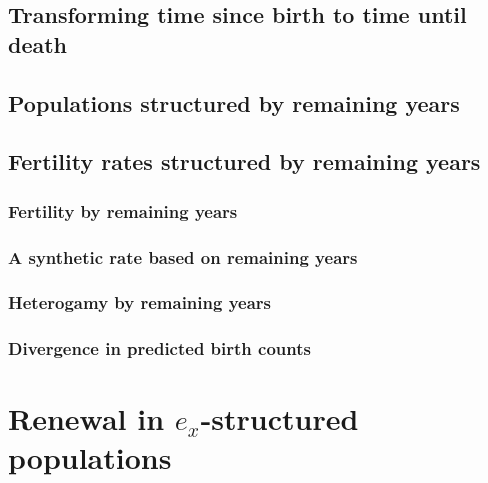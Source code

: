   \section{Transforming time since birth to time until death}
    
    
  \section{Populations structured by remaining years}
    
  
  \section{Fertility rates structured by remaining years}
    
    
    \subsection{Fertility by remaining years}
      
      
    \subsection{A synthetic rate based on remaining years}
      
    
    \subsection{Heterogamy by remaining years}
      
      
    \subsection{Divergence in predicted birth counts}
      
      
\chapter{Renewal in $e_x$-structured populations}
  
    
